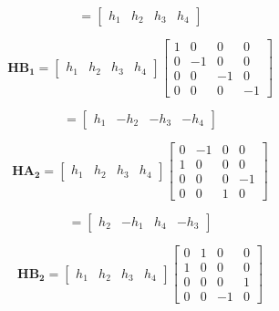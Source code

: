 \documentclass[fleqn]{article}
\begin{document}
\begin{enumerate}
\begin{enumerate}
			\begin{equation*}
				= \begin{bmatrix}
					h_1 & h_2 & h_3 & h_4
				\end{bmatrix}
			\end{equation*}
			
			\begin{equation*}
				\mathbf{HB_1} = \begin{bmatrix}
					h_1 & h_2 & h_3 & h_4
				\end{bmatrix}\begin{bmatrix}
					1 &  0 &  0 &  0 \\
					0 & -1 &  0 &  0 \\
					0 &  0 & -1 &  0 \\
					0 &  0 &  0 & -1
				\end{bmatrix}
			\end{equation*}
			
			\begin{equation*}
				 = \begin{bmatrix}
					h_1 & -h_2 & -h_3 & -h_4
				\end{bmatrix}
			\end{equation*}
			
			\begin{equation*}
				\mathbf{HA_2} = \begin{bmatrix}
					h_1 & h_2 & h_3 & h_4
				\end{bmatrix}\begin{bmatrix}
					0 & -1 & 0 &  0 \\
					1 &  0 & 0 &  0 \\
					0 &  0 & 0 & -1 \\
					0 &  0 & 1 &  0
				\end{bmatrix}
			\end{equation*}
			
			\begin{equation*}
				= \begin{bmatrix}
					h_2 & -h_1 & h_4 & -h_3
				\end{bmatrix}
			\end{equation*}
			
			\begin{equation*}
				\mathbf{HB_2} = \begin{bmatrix}
					h_1 & h_2 & h_3 & h_4
				\end{bmatrix}\begin{bmatrix}
					0 & 1 &  0 & 0 \\
					1 & 0 &  0 & 0 \\
					0 & 0 &  0 & 1 \\
					0 & 0 & -1 & 0
				\end{bmatrix}
			\end{equation*}
			

\end{enumerate}
\end{enumerate}
\end{document}
